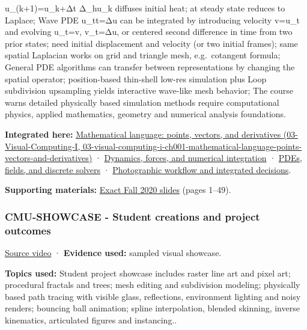 u\_(k+1)=u\_k+Δt Δ\_hu\_k diffuses initial heat; at steady state reduces to Laplace; Wave PDE u\_tt=Δu can be integrated by introducing velocity v=u\_t and evolving u\_t=v, v\_t=Δu, or centered second difference in time from two prior states; need initial displacement and velocity (or two initial frames); same spatial Laplacian works on grid and triangle mesh, e.g.~cotangent formula; General PDE algorithms can transfer between representations by changing the spatial operator; position-based thin-shell low-res simulation plus Loop subdivision upsampling yields interactive wave-like mesh behavior; The course warns detailed physically based simulation methods require computational physics, applied mathematics, geometry and numerical analysis foundations.

\textbf{Integrated here:} \href{../03-Visual-Computing-I/main.pdf\#nameddest=03-visual-computing-i-ch001-mathematical-language-points-vectors-and-derivatives}{Mathematical language: points, vectors, and derivatives (03-Visual-Computing-I, 03-visual-computing-i-ch001-mathematical-language-points-vectors-and-derivatives)} · \hyperref[04-visual-computing-ii-ch029-dynamics-forces-and-numerical-integration]{Dynamics, forces, and numerical integration} · \hyperref[04-visual-computing-ii-ch030-pdes-fields-and-discrete-solvers]{PDEs, fields, and discrete solvers} · \hyperref[04-visual-computing-ii-ch034-photographic-workflow-and-integrated-decisions]{Photographic workflow and integrated decisions}.

\textbf{Supporting materials:} \href{https://15462.courses.cs.cmu.edu/fall2020content/lectures/23_pdes/23_pdes_slides.pdf}{Exact Fall 2020 slides} (pages 1--49).

\subsubsection{CMU-SHOWCASE - Student creations and project outcomes}\label{04-visual-computing-ii-ch036-cmu-showcase---student-creations-and-project-outcomes}

\href{https://www.youtube.com/watch?v=yJ5eY3EIImA}{Source video} · \textbf{Evidence used:} sampled visual showcase.

\textbf{Topics used:} Student project showcase includes raster line art and pixel art; procedural fractals and trees; mesh editing and subdivision modeling; physically based path tracing with visible glass, reflections, environment lighting and noisy renders; bouncing ball animation; spline interpolation, blended skinning, inverse kinematics, articulated figures and instancing..

